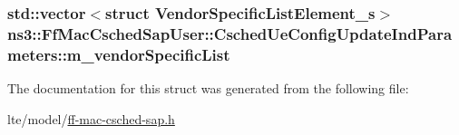 \subsubsection[{\texorpdfstring{m\+\_\+vendor\+Specific\+List}{m_vendorSpecificList}}]{\setlength{\rightskip}{0pt plus 5cm}std\+::vector$<$struct {\bf Vendor\+Specific\+List\+Element\+\_\+s}$>$ ns3\+::\+Ff\+Mac\+Csched\+Sap\+User\+::\+Csched\+Ue\+Config\+Update\+Ind\+Parameters\+::m\+\_\+vendor\+Specific\+List}\hypertarget{structns3_1_1FfMacCschedSapUser_1_1CschedUeConfigUpdateIndParameters_a31d641211714ea927dcb451b7e1cedc7}{}\label{structns3_1_1FfMacCschedSapUser_1_1CschedUeConfigUpdateIndParameters_a31d641211714ea927dcb451b7e1cedc7}


The documentation for this struct was generated from the following file\+:\begin{DoxyCompactItemize}
\item 
lte/model/\hyperlink{ff-mac-csched-sap_8h}{ff-\/mac-\/csched-\/sap.\+h}\end{DoxyCompactItemize}
